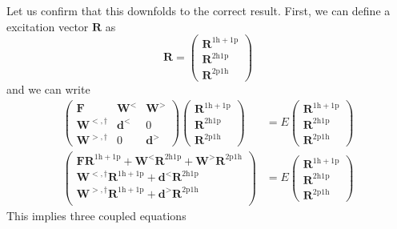 \begin{tcolorbox}[colback=red!10!white, colframe=red!50!black, title=Downfolding exercise]
Let us confirm that this downfolds to the correct result. First, we can define a excitation vector $\bm{R}$ as
\begin{equation}
    \bm{R} = \begin{pmatrix} \bm{R}^{1\mathrm{h}+1\mathrm{p}} \\ \bm{R}^{2\mathrm{h}1\mathrm{p}} \\ \bm{R}^{2\mathrm{p}1\mathrm{h}} \end{pmatrix}
\end{equation}
and we can write
\begin{align}
    \begin{pmatrix} \bm{F} & \bm{W}^< & \bm{W}^> \\ \bm{W}^{<,\dagger} & \bm{d}^< & 0 \\ \bm{W}^{>, \dagger} & 0 & \bm{d}^> \end{pmatrix} \begin{pmatrix} \bm{R}^{1\mathrm{h}+1\mathrm{p}} \\ \bm{R}^{2\mathrm{h}1\mathrm{p}} \\ \bm{R}^{2\mathrm{p}1\mathrm{h}} \end{pmatrix} &= E \begin{pmatrix} \bm{R}^{1\mathrm{h}+1\mathrm{p}} \\ \bm{R}^{2\mathrm{h}1\mathrm{p}} \\ \bm{R}^{2\mathrm{p}1\mathrm{h}} \end{pmatrix} \\
\begin{pmatrix}
    \bm{F} \bm{R}^{1\mathrm{h}+1\mathrm{p}} + \bm{W}^< \bm{R}^{2\mathrm{h}1\mathrm{p}} + \bm{W}^> \bm{R}^{2\mathrm{p}1\mathrm{h}} \\
    \bm{W}^{<,\dagger} \bm{R}^{1\mathrm{h}+1\mathrm{p}} + \bm{d}^< \bm{R}^{2\mathrm{h}1\mathrm{p}} \\
    \bm{W}^{>, \dagger} \bm{R}^{1\mathrm{h}+1\mathrm{p}} + \bm{d}^> \bm{R}^{2\mathrm{p}1\mathrm{h}} \\
\end{pmatrix}
&= E \begin{pmatrix} \bm{R}^{1\mathrm{h}+1\mathrm{p}} \\ \bm{R}^{2\mathrm{h}1\mathrm{p}} \\ \bm{R}^{2\mathrm{p}1\mathrm{h}} \end{pmatrix}
\end{align}
This implies three coupled equations

\end{tcolorbox}
